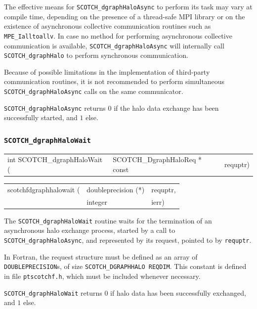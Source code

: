 \begin{itemize}
The effective means for {\tt SCOTCH\_dgraph\lbt Halo\lbt Async} to
perform its task may vary at compile time, depending on the presence
of a thread-safe MPI library or on the existence of asynchronous
collective communication routines such as {\tt MPE\_\lbt Ialltoallv}.
In case no method for performing asynchronous collective communication
is available, {\tt SCOTCH\_dgraph\lbt Halo\lbt Async} will internally
call {\tt SCOTCH\_dgraph\lbt Halo} to perform synchronous communication.

Because of possible limitations in the implementation of third-party
communication routines, it is not recommended to perform simultaneous
{\tt SCOTCH\_dgraph\lbt Halo\lbt Async} calls on the same communicator.

\progret

{\tt SCOTCH\_dgraphHaloAsync} returns $0$ if the halo data exchange
has been successfully started, and $1$ else.
\end{itemize}

\subsubsection{{\tt SCOTCH\_dgraphHaloWait}}
\label{sec-lib-func-dgraphhalowait}

\begin{itemize}
\progsyn

{\tt\begin{tabular}{l@{}ll}

int SCOTCH\_dgraphHaloWait ( & SCOTCH\_DgraphHaloReq * const & requptr)
\end{tabular}}

{\tt\begin{tabular}{l@{}ll}
scotchfdgraphhalowait ( & doubleprecision (*) & requptr, \\
                        & integer             & ierr)
\end{tabular}}

\progdes

The {\tt SCOTCH\_dgraphHaloWait} routine waits for the termination of
an asynchronous halo exchange process, started by a call to {\tt
SCOTCH\_dgraph\lbt Halo\lbt Async}, and represented by its request,
pointed to by {\tt requptr}.

In Fortran, the request structure must be defined as an array of
{\tt DOUBLEPRECISION}s, of size {\tt SCOTCH\_\lbt DGRAPH\lbt HALO\lbt
REQDIM}. This constant is defined in file {\tt ptscotchf.h}, which
must be included whenever necessary.

\progret

{\tt SCOTCH\_dgraphHaloWait} returns $0$ if halo data has been
successfully exchanged, and $1$ else.
\end{itemize}

